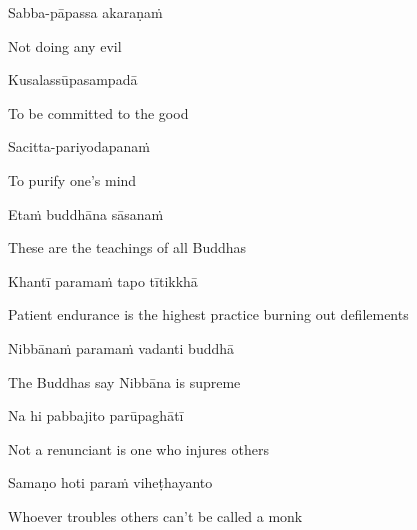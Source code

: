 \vspace{-0.15cm}

Sabba-pāpassa akaraṇaṁ\hyperlink{endnote33-appendix}{\hypertarget{endnote33-body}{}}

\begin{english}
  Not doing any evil
\end{english}

Kusalassūpasampadā

\begin{english}
  To be committed to the good
\end{english}

Sacitta-pariyodapanaṁ

\begin{english}
  To purify one's mind
\end{english}

Etaṁ buddhāna sāsanaṁ

\begin{english}
  These are the teachings of all Buddhas
\end{english}

Khantī paramaṁ tapo tītikkhā

\begin{english}
  Patient endurance is the highest practice burning out defilements
\end{english}

Nibbānaṁ paramaṁ vadanti buddhā

\begin{english}
  The Buddhas say Nibbāna is supreme
\end{english}

Na hi pabbajito parūpaghātī

\begin{english}
  Not a renunciant is one who injures others
\end{english}

Samaṇo hoti paraṁ viheṭhayanto

\begin{english}
  Whoever troubles others can't be called a monk
\end{english}

